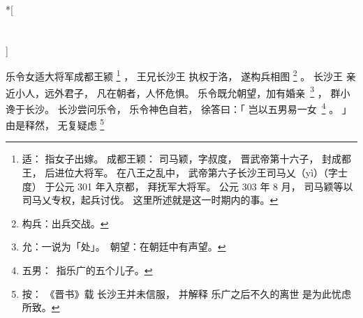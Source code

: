 
\switchcolumn[0]*[\section{}]

乐令女适大将军成都王颍%
\footnote{%
    适：
        指女子出嫁。
    成都王颖：
        司马颖，字叔度，
        晋武帝第十六子，
        封成都王，
        后进位大将军。
        在八王之乱中，
        武帝第六子长沙王司马乂（yì）（字士度）
        于公元 301 年入京都，
        拜抚军大将军。
        公元 303 年 8 月，
        司马颖等以司马乂专权，起兵讨伐。
        这里所述就是这一时期内的事。
}%
，
王兄长沙王
执权于洛，
遂构兵相图%
\footnote{%
    构兵：出兵交战。
}%
。
长沙王
亲近小人，远外君子，
凡在朝者，人怀危惧。
乐令既允朝望，加有婚\mbox{亲%
\footnote{%
    允：一说为「处」。
    朝望：在朝廷中有声望。
}}%
，
群小谗于长沙。
长沙尝问乐令，
乐令神色自若，
徐答曰：「
    岂以五男易一\mbox{女%
    \footnote{%
        五男：
            指乐广的五个儿子。
    }}%
    。
」
由是释然，
无复疑虑%
\footnote{%
    按：
        《晋书》载
        长沙王并未信服，
        并解释
        乐广之后不久的离世
        是为此忧虑所致。
}%

\switchcolumn



